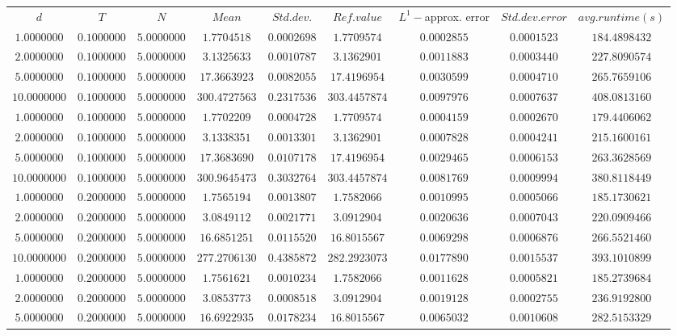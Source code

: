 \begin{tabular}{ccccccccc}
$d$ & $T$ & $N$ & $Mean$ & $Std. dev.$ & $Ref. value$ & $L^1-$approx. error & $Std. dev. error$ & $avg. runtime (s)$\\
$1.0000000$ & $0.1000000$ & $5.0000000$ & $1.7704518$ & $0.0002698$ & $1.7709574$ & $0.0002855$ & $0.0001523$ & $184.4898432$\\
$2.0000000$ & $0.1000000$ & $5.0000000$ & $3.1325633$ & $0.0010787$ & $3.1362901$ & $0.0011883$ & $0.0003440$ & $227.8090574$\\
$5.0000000$ & $0.1000000$ & $5.0000000$ & $17.3663923$ & $0.0082055$ & $17.4196954$ & $0.0030599$ & $0.0004710$ & $265.7659106$\\
$10.0000000$ & $0.1000000$ & $5.0000000$ & $300.4727563$ & $0.2317536$ & $303.4457874$ & $0.0097976$ & $0.0007637$ & $408.0813160$\\
$1.0000000$ & $0.1000000$ & $5.0000000$ & $1.7702209$ & $0.0004728$ & $1.7709574$ & $0.0004159$ & $0.0002670$ & $179.4406062$\\
$2.0000000$ & $0.1000000$ & $5.0000000$ & $3.1338351$ & $0.0013301$ & $3.1362901$ & $0.0007828$ & $0.0004241$ & $215.1600161$\\
$5.0000000$ & $0.1000000$ & $5.0000000$ & $17.3683690$ & $0.0107178$ & $17.4196954$ & $0.0029465$ & $0.0006153$ & $263.3628569$\\
$10.0000000$ & $0.1000000$ & $5.0000000$ & $300.9645473$ & $0.3032764$ & $303.4457874$ & $0.0081769$ & $0.0009994$ & $380.8118449$\\
$1.0000000$ & $0.2000000$ & $5.0000000$ & $1.7565194$ & $0.0013807$ & $1.7582066$ & $0.0010995$ & $0.0005066$ & $185.1730621$\\
$2.0000000$ & $0.2000000$ & $5.0000000$ & $3.0849112$ & $0.0021771$ & $3.0912904$ & $0.0020636$ & $0.0007043$ & $220.0909466$\\
$5.0000000$ & $0.2000000$ & $5.0000000$ & $16.6851251$ & $0.0115520$ & $16.8015567$ & $0.0069298$ & $0.0006876$ & $266.5521460$\\
$10.0000000$ & $0.2000000$ & $5.0000000$ & $277.2706130$ & $0.4385872$ & $282.2923073$ & $0.0177890$ & $0.0015537$ & $393.1010899$\\
$1.0000000$ & $0.2000000$ & $5.0000000$ & $1.7561621$ & $0.0010234$ & $1.7582066$ & $0.0011628$ & $0.0005821$ & $185.2739684$\\
$2.0000000$ & $0.2000000$ & $5.0000000$ & $3.0853773$ & $0.0008518$ & $3.0912904$ & $0.0019128$ & $0.0002755$ & $236.9192800$\\
$5.0000000$ & $0.2000000$ & $5.0000000$ & $16.6922935$ & $0.0178234$ & $16.8015567$ & $0.0065032$ & $0.0010608$ & $282.5153329$\\

\end{tabular}
